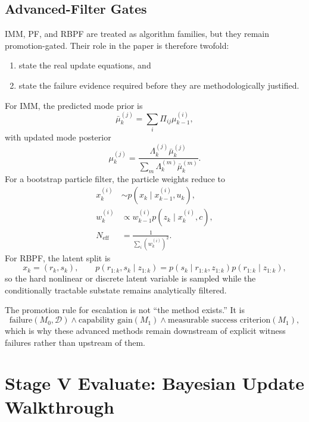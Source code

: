 \documentclass[11pt]{article}
\begin{document}
\subsection{Advanced-Filter Gates}
IMM, PF, and RBPF are treated as algorithm families, but they remain
promotion-gated. Their role in the paper is therefore twofold:
\begin{enumerate}[leftmargin=1.5em]
  \item state the real update equations, and
  \item state the failure evidence required before they are methodologically
  justified.
\end{enumerate}

For IMM, the predicted mode prior is
\begin{equation}
\bar{\mu}_k^{(j)} = \sum_i \Pi_{ij}\mu_{k-1}^{(i)},
\end{equation}
with updated mode posterior
\begin{equation}
\mu_k^{(j)}
=
\frac{\Lambda_k^{(j)}\bar{\mu}_k^{(j)}}{\sum_m \Lambda_k^{(m)}\bar{\mu}_k^{(m)}}.
\end{equation}
For a bootstrap particle filter, the particle weights reduce to
\begin{align}
x_k^{(i)} &\sim p(x_k \mid x_{k-1}^{(i)}, u_k), \\
w_k^{(i)} &\propto w_{k-1}^{(i)} p(z_k \mid x_k^{(i)}, c), \\
N_{\mathrm{eff}} &= \frac{1}{\sum_i (w_k^{(i)})^2}.
\end{align}
For RBPF, the latent split is
\begin{equation}
x_k = (r_k, s_k),
\qquad
p(r_{1:k}, s_k \mid z_{1:k})
=
p(s_k \mid r_{1:k}, z_{1:k}) p(r_{1:k} \mid z_{1:k}),
\end{equation}
so the hard nonlinear or discrete latent variable is sampled while the
conditionally tractable substate remains analytically filtered.

The promotion rule for escalation is not “the method exists.” It is
\begin{equation}
\text{failure}(M_0, \mathcal{D})
\land
\text{capability gain}(M_1)
\land
\text{measurable success criterion}(M_1),
\end{equation}
which is why these advanced methods remain downstream of explicit witness
failures rather than upstream of them.

\section{Stage V Evaluate: Bayesian Update Walkthrough}
\end{document}
